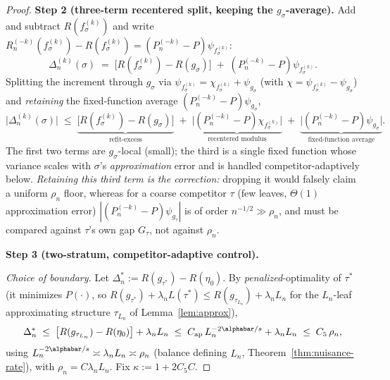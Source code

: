 \begin{proof}
\smallskip\noindent\textbf{Step 2 (three-term recentered split, keeping the
$g_\sigma$-average).} Add and subtract $R(f_\sigma^{(k)})$ and write
$R_n^{(-k)}(f_\sigma^{(k)})-R(f_\sigma^{(k)})=(P_n^{(-k)}-P)\psi_{f_\sigma^{(k)}}$:
\begin{equation}\label{eq:fluct-split-raw}
  \Delta_n^{(k)}(\sigma)
  \;=\; \bigl[R(f_\sigma^{(k)})-R(g_\sigma)\bigr]
     \;+\; (P_n^{(-k)}-P)\psi_{f_\sigma^{(k)}}.
\end{equation}
Splitting the increment through $g_\sigma$ via
$\psi_{f_\sigma^{(k)}}=\chi_{f_\sigma^{(k)}}+\psi_{g_\sigma}$ (with
$\chi=\psi_{f_\sigma^{(k)}}-\psi_{g_\sigma}$) and \emph{retaining} the
fixed-function average $(P_n^{(-k)}-P)\psi_{g_\sigma}$,
\begin{equation}\label{eq:fluct-recentered}
  \bigl|\Delta_n^{(k)}(\sigma)\bigr|
  \;\le\; \underbrace{\bigl[R(f_\sigma^{(k)})-R(g_\sigma)\bigr]}_{\text{refit-excess}}
   \;+\; \underbrace{\bigl|(P_n^{(-k)}-P)\chi_{f_\sigma^{(k)}}\bigr|}_{\text{recentered modulus}}
   \;+\; \underbrace{\bigl|(P_n^{(-k)}-P)\psi_{g_\sigma}\bigr|}_{\text{fixed-function average}}.
\end{equation}
The first two terms are $g_\sigma$-local (small); the third is a single fixed
function whose variance scales with $\sigma$'s \emph{approximation} error and is
handled competitor-adaptively below. \emph{Retaining this third term is the
correction:} dropping it would falsely claim a uniform $\rho_n$ floor, whereas
for a coarse competitor $\tau$ (few leaves, $\Theta(1)$ approximation error)
$|(P_n^{(-k)}-P)\psi_{g_\tau}|$ is of order $n^{-1/2}\gg\rho_n$, and must be
compared against $\tau$'s own gap $G_\tau$, not against $\rho_n$.

\smallskip\noindent\textbf{Step 3 (two-stratum, competitor-adaptive control).}

\emph{Choice of boundary.} Let $\Delta^\ast_n:=R(g_{\tau^\ast})-R(\eta_0)$. By
\emph{penalized}-optimality of $\tau^\ast$ (it minimizes $P(\cdot)$, so
$R(g_{\tau^\ast})+\lambda_n L(\tau^\ast)\le R(g_{\tau_{L_n}})+\lambda_n L_n$ for
the $L_n$-leaf approximating structure $\tau_{L_n}$ of Lemma~\ref{lem:approx}),
\begin{equation}\label{eq:tau-star-approx}
  \Delta^\ast_n
  \;\le\; \bigl[R(g_{\tau_{L_n}})-R(\eta_0)\bigr] + \lambda_n L_n
  \;\le\; C_{\mathrm{ap}}\,L_n^{-2\alphabar/s} + \lambda_n L_n
  \;\le\; C_5\,\rho_n,
\end{equation}
using $L_n^{-2\alphabar/s}\asymp\lambda_n L_n\asymp\rho_n$ (balance defining
$L_n$, Theorem~\ref{thm:nuisance-rate}), with $\rho_n=C\lambda_n L_n$. Fix
$\kappa:=1+2C_5C$.


\end{proof}

